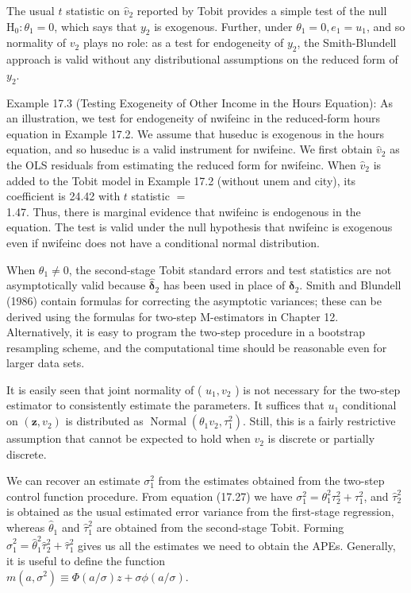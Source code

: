 \documentclass[10pt]{article}
\begin{document}
The usual $t$ statistic on $\hat{v}_{2}$ reported by Tobit provides a simple test of the null $\mathrm{H}_{0}: \theta_{1}=0$, which says that $y_{2}$ is exogenous. Further, under $\theta_{1}=0, e_{1}=u_{1}$, and so normality of $v_{2}$ plays no role: as a test for endogeneity of $y_{2}$, the Smith-Blundell approach is valid without any distributional assumptions on the reduced form of $y_{2}$.

Example 17.3 (Testing Exogeneity of Other Income in the Hours Equation): As an illustration, we test for endogeneity of nwifeinc in the reduced-form hours equation in Example 17.2. We assume that huseduc is exogenous in the hours equation, and so huseduc is a valid instrument for nwifeinc. We first obtain $\hat{v}_{2}$ as the OLS residuals from estimating the reduced form for nwifeinc. When $\hat{v}_{2}$ is added to the Tobit model in Example 17.2 (without unem and city), its coefficient is 24.42 with $t$ statistic $=$\\
1.47. Thus, there is marginal evidence that nwifeinc is endogenous in the equation. The test is valid under the null hypothesis that nwifeinc is exogenous even if nwifeinc does not have a conditional normal distribution.

When $\theta_{1} \neq 0$, the second-stage Tobit standard errors and test statistics are not asymptotically valid because $\hat{\boldsymbol{\delta}}_{2}$ has been used in place of $\boldsymbol{\delta}_{2}$. Smith and Blundell (1986) contain formulas for correcting the asymptotic variances; these can be derived using the formulas for two-step M-estimators in Chapter 12. Alternatively, it is easy to program the two-step procedure in a bootstrap resampling scheme, and the computational time should be reasonable even for larger data sets.

It is easily seen that joint normality of ( $u_{1}, v_{2}$ ) is not necessary for the two-step estimator to consistently estimate the parameters. It suffices that $u_{1}$ conditional on $\left(\mathbf{z}, v_{2}\right)$ is distributed as $\operatorname{Normal}\left(\theta_{1} v_{2}, \tau_{1}^{2}\right)$. Still, this is a fairly restrictive assumption that cannot be expected to hold when $v_{2}$ is discrete or partially discrete.

We can recover an estimate $\sigma_{1}^{2}$ from the estimates obtained from the two-step control function procedure. From equation (17.27) we have $\sigma_{1}^{2}=\theta_{1}^{2} \tau_{2}^{2}+\tau_{1}^{2}$, and $\hat{\tau}_{2}^{2}$ is obtained as the usual estimated error variance from the first-stage regression, whereas $\hat{\theta}_{1}$ and $\hat{\tau}_{1}^{2}$ are obtained from the second-stage Tobit. Forming $\hat{\sigma}_{1}^{2}=\hat{\theta}_{1}^{2} \hat{\tau}_{2}^{2}+\hat{\tau}_{1}^{2}$ gives us all the estimates we need to obtain the APEs. Generally, it is useful to define the function\\
$m\left(a, \sigma^{2}\right) \equiv \Phi(a / \sigma) z+\sigma \phi(a / \sigma)$.
\end{document}
